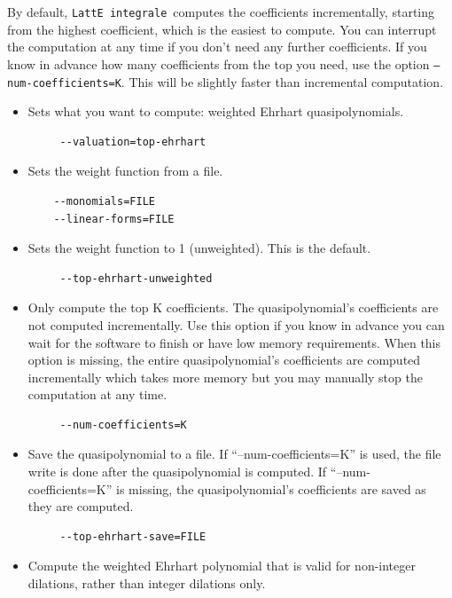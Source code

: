 \documentclass{article}
\newcommand{\latteInt}{{\tt LattE integrale}\xspace}
\begin{document}
By default, \latteInt\ computes the coefficients incrementally, starting from
the highest coefficient, which is the easiest to compute.  
You can interrupt the computation at any time if you
don't need any further coefficients. 
If you know in advance how many coefficients from the top you need, use  the
option \texttt{--num-coefficients=K}.  This will be slightly faster than
incremental computation. 



\begin{itemize}
\item Sets what you want to compute: weighted Ehrhart quasipolynomials. 
        \begin{verbatim}
     --valuation=top-ehrhart
        \end{verbatim}  
\item Sets the weight function from a file.
        \begin{verbatim}
    --monomials=FILE
    --linear-forms=FILE
        \end{verbatim}  
\item Sets the weight function to 1 (unweighted). This is the default. 
        \begin{verbatim}
     --top-ehrhart-unweighted
        \end{verbatim} 
\item Only compute the top K coefficients. The quasipolynomial's coefficients are not computed incrementally. Use this option if you know in advance you can wait for the software to finish or have low memory requirements. When this option is missing, the entire quasipolynomial's coefficients are computed incrementally which takes more memory but you may manually stop the computation at any time.
        \begin{verbatim}
     --num-coefficients=K
        \end{verbatim}
\item Save the quasipolynomial to a file. If ``--num-coefficients=K'' is
  used, the file write is done after the quasipolynomial is computed. If
  ``--num-coefficients=K'' is missing, the quasipolynomial's coefficients
  are saved as they are computed. 
        \begin{verbatim}
     --top-ehrhart-save=FILE
        \end{verbatim}          
\item Compute the weighted Ehrhart polynomial that is valid for non-integer
  dilations, rather than integer dilations only. 

\end{itemize}
\end{document}
